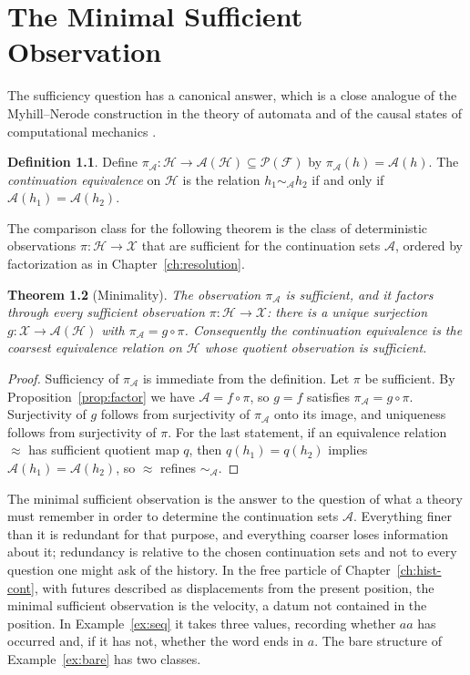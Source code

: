 \documentclass[11pt,oneside]{book}
\newtheorem{theorem}{Theorem}[chapter]
\theoremstyle{definition}
\newtheorem{definition}[theorem]{Definition}
\theoremstyle{remark}
\newcommand{\Hist}{\mathcal{H}}
\newcommand{\Fut}{\mathcal{F}}
\newcommand{\Adm}{\mathcal{A}}
\newcommand{\Obs}{\mathcal{X}}
\begin{document}
\chapter{The Minimal Sufficient Observation}\label{ch:minimal-obs}

The sufficiency question has a canonical answer, which is a close analogue of the Myhill--Nerode construction in the theory of automata \cite{nerode1958} and of the causal states of computational mechanics \cite{crutchfield1989,shalizi2001}.

\begin{definition}
Define $\pi_\Adm\colon\Hist\to\Adm(\Hist)\subseteq\mathcal P(\Fut)$ by $\pi_\Adm(h)=\Adm(h)$. The \emph{continuation equivalence} on $\Hist$ is the relation $h_1\sim_\Adm h_2$ if and only if $\Adm(h_1)=\Adm(h_2)$.
\end{definition}

The comparison class for the following theorem is the class of deterministic observations $\pi\colon\Hist\to\Obs$ that are sufficient for the continuation sets $\Adm$, ordered by factorization as in Chapter~\ref{ch:resolution}.

\begin{theorem}[Minimality]\label{thm:minimal}
The observation $\pi_\Adm$ is sufficient, and it factors through every sufficient observation $\pi\colon\Hist\to\Obs$: there is a unique surjection $g\colon\Obs\to\Adm(\Hist)$ with $\pi_\Adm=g\circ\pi$. Consequently the continuation equivalence is the coarsest equivalence relation on $\Hist$ whose quotient observation is sufficient.
\end{theorem}

\begin{proof}
Sufficiency of $\pi_\Adm$ is immediate from the definition. Let $\pi$ be sufficient. By Proposition~\ref{prop:factor} we have $\Adm=f\circ\pi$, so $g=f$ satisfies $\pi_\Adm=g\circ\pi$. Surjectivity of $g$ follows from surjectivity of $\pi_\Adm$ onto its image, and uniqueness follows from surjectivity of $\pi$. For the last statement, if an equivalence relation $\approx$ has sufficient quotient map $q$, then $q(h_1)=q(h_2)$ implies $\Adm(h_1)=\Adm(h_2)$, so $\approx$ refines $\sim_\Adm$.
\end{proof}

The minimal sufficient observation is the answer to the question of what a theory must remember in order to determine the continuation sets $\Adm$. Everything finer than it is redundant for that purpose, and everything coarser loses information about it; redundancy is relative to the chosen continuation sets and not to every question one might ask of the history. In the free particle of Chapter~\ref{ch:hist-cont}, with futures described as displacements from the present position, the minimal sufficient observation is the velocity, a datum not contained in the position. In Example~\ref{ex:seq} it takes three values, recording whether $aa$ has occurred and, if it has not, whether the word ends in $a$. The bare structure of Example~\ref{ex:bare} has two classes.
\end{document}
